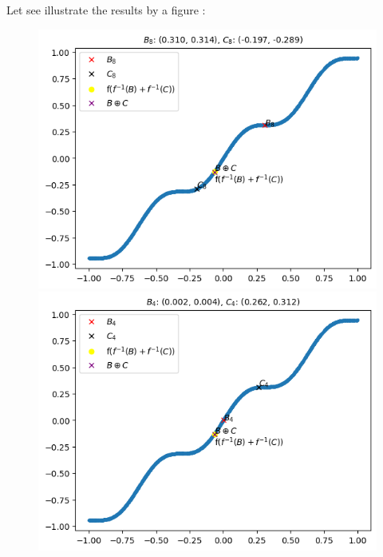 \documentclass{article}
\begin{document}
            Let see illustrate the results by a figure :
            \begin{figure}[h]
                \centering
                \begin{minipage}{0.5\textwidth}
                    \centering
                    \includegraphics[width=0.9\linewidth]{./images/1.png}
                \end{minipage}%
                \begin{minipage}{0.5\textwidth}
                    \centering
                    \includegraphics[width=0.9\linewidth]{./images/2.png}
                \end{minipage}
            \end{figure}
            
\end{document}
